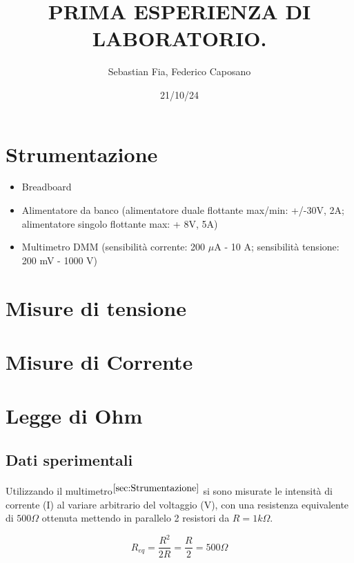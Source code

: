 \documentclass{article}
\title{PRIMA ESPERIENZA DI LABORATORIO.
}
\author{Sebastian Fia, Federico Caposano}
\date{21/10/24}
\begin{document}
	
	\maketitle   %
	
	\section{Strumentazione} \label{sec:Strumentazione}
	 	\begin{itemize} 
	 		\item Breadboard
	 		\item Alimentatore da banco (alimentatore duale flottante max/min: +/-30V, 2A; alimentatore singolo flottante max: + 8V, 5A)
	 		\item Multimetro DMM (sensibilità corrente: 200 $\mu$A - 10 A; sensibilità tensione: 200 mV - 1000 V)
	 	
	 	\end{itemize}
	
	\section{Misure di tensione} \label{sec:Tensione}
	\section{Misure di Corrente} \label{sec:Corrente}
	
	
	
	\section{Legge di Ohm} \label{sec:Ohm}
		\subsection{Dati sperimentali}
			\paragraph{}
				Utilizzando il multimetro$^{\ref{sec:Strumentazione}}$ si sono misurate le intensità di corrente (I) al variare arbitrario del voltaggio (V), con una resistenza equivalente di $500\Omega$ ottenuta mettendo in parallelo 2 resistori da $R=1k\Omega$.
				\begin{center}
					\begin{equation}\label{eq:Resistenza}
						R_{eq} = \frac{R^2}{2R}  = \frac{R}{2} = 500\Omega
					\end{equation}
				\end{center}
				
\end{document}
